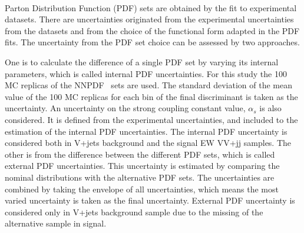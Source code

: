 \noindent\textbf{}\\
%
Parton Distribution Function (PDF) sets are obtained by the fit to experimental datasets. 
There are uncertainties originated from the experimental uncertainties from the datasets and from the choice of the functional form adapted in the PDF fits.
The uncertainty from the PDF set choice can be assessed by two approaches. 

One is to calculate the difference of a single PDF set by varying its internal parameters, which is called internal PDF uncertainties. 
For this study the 100 MC replicas of the NNPDF~\cite{Ball:2014uwa} sets are used. 
The standard deviation of the mean value of the 100 MC replicas for each bin of the final discriminant is taken as the uncertainty. 
An uncertainty on the strong coupling constant value, $\alpha_s$ is also considered. 
It is defined from the experimental uncertainties, and included to the estimation of the internal PDF uncertainties. 
The internal PDF uncertainty is considered both in V+jets background and the signal EW VV+jj samples.
%
The other is from the difference between the different PDF sets, which is called external PDF uncertainties. 
This uncertainty is estimated by comparing the nominal distributions with the alternative PDF sets. 
The uncertainties are combined by taking the envelope of all uncertainties, which means the most varied uncertainty is taken as the final uncertainty. 
External PDF uncertainty is considered only in V+jets background sample due to the missing of the alternative sample in signal.


